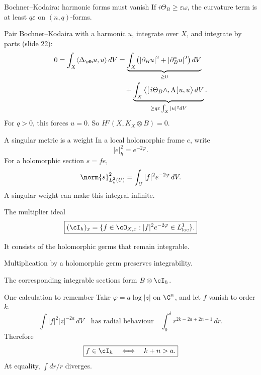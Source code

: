 \begin{frame}{Bochner--Kodaira: harmonic forms must vanish}
If \(i\Theta_B\ge\varepsilon\omega\), the curvature term is at least \(q\varepsilon\) on \((n,q)\)-forms.
\par\medskip
Pair Bochner--Kodaira with a harmonic \(u\), integrate over \(X\), and integrate by parts (slide 22):
\[
\begin{aligned}
0=\int_X\langle\Delta_{\db}u,u\rangle\,dV
&=\underbrace{\int_X\bigl(|\partial_Bu|^2+|\partial_B^*u|^2\bigr)\,dV}_{\ge0}\\
&\quad+\underbrace{\int_X\big\langle[\,i\Theta_B\wedge,\Lambda\,]u,u\big\rangle\,dV}_{\ge q\varepsilon\int_X|u|^2dV}.
\end{aligned}
\]
For \(q>0\), this forces \(u=0\). So \(\boxed{H^q(X,K_X\otimes B)=0.}\)
\end{frame}

\begin{frame}{A singular metric is a weight}
In a local holomorphic frame \(e\), write
\[
|e|_h^2=e^{-2\varphi}.
\]
For a holomorphic section \(s=fe\),
\[
\norm{s}_{L^2_h(U)}^2=\int_U |f|^2e^{-2\varphi}\,dV.
\]
A singular weight can make this integral infinite.
\end{frame}

\begin{frame}{The multiplier ideal}
\[
\boxed{(\cI_h)_x=
\{f\in\cO_{X,x}:|f|^2e^{-2\varphi}\in L^1_{\rm loc}\}.}
\]
\medskip
\par It consists of the holomorphic germs that remain integrable.
\par Multiplication by a holomorphic germ preserves integrability.
\medskip
\par The corresponding integrable sections form \(B\otimes\cI_h\).
\end{frame}

\begin{frame}{One calculation to remember}
Take \(\varphi=a\log|z|\) on \(\C^n\), and let \(f\) vanish to order \(k\).
\[
\int |f|^2|z|^{-2a}\,dV
\quad\text{has radial behaviour}\quad
\int_0^\delta r^{2k-2a+2n-1}\,dr.
\]
Therefore
\[
\boxed{f\in\cI_h\quad\Longleftrightarrow\quad k+n>a.}
\]
At equality, \(\int dr/r\) diverges.
\end{frame}

